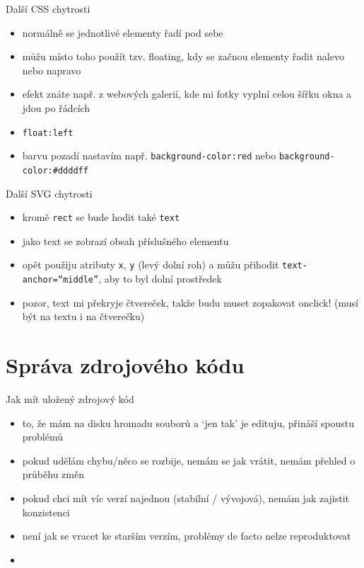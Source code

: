 \documentclass{beamer}
\begin{document}
\begin{frame}{Další CSS chytrosti}
  \begin{itemize}
    \item normálně se jednotlivé elementy řadí pod sebe
    \item můžu místo toho použít tzv. floating, kdy se začnou elementy řadit nalevo nebo napravo
    \item efekt znáte např. z webových galerií, kde mi fotky vyplní celou šířku okna a jdou po řádcích
    \item \texttt{float:left}
    \item barvu pozadí nastavím např. \texttt{background-color:red} nebo \texttt{background-color:\#ddddff}
  \end{itemize}
\end{frame}


\begin{frame}{Další SVG chytrosti}
  \begin{itemize}
    \item kromě \texttt{rect} se bude hodit také \texttt{text}
    \item jako text se zobrazí obsah příslušného elementu
    \item opět použiju atributy \texttt{x}, \texttt{y} (levý dolní roh) a můžu přihodit \texttt{text-anchor=``middle''}, aby to byl dolní prostředek
    \item pozor, text mi překryje čtvereček, takže budu muset zopakovat onclick! (musí být na textu i na čtverečku)
  \end{itemize}
\end{frame}

\section{Správa zdrojového kódu}

\begin{frame}{Jak mít uložený zdrojový kód}
  \begin{itemize}
    \item to, že mám na disku hromadu souborů a `jen tak' je edituju, přináší spoustu problémů
    \item pokud udělám chybu/něco se rozbije, nemám se jak vrátit, nemám přehled o průběhu změn
    \item pokud chci mít víc verzí najednou (stabilní / vývojová), nemám jak zajistit konzistenci
    \item není jak se vracet ke starším verzím, problémy de facto nelze reproduktovat
    \item
  \end{itemize}
\end{frame}
\end{document}
